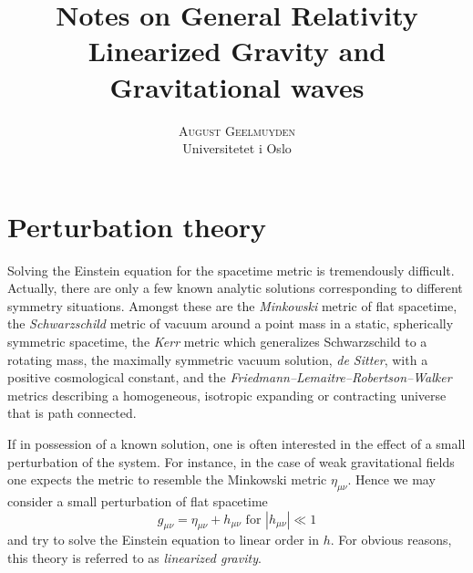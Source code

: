 \documentclass[twoside,utf8]{article}
\title{\vspace{-15mm}\fontsize{24pt}{10pt}\selectfont  Notes on General Relativity\\
\textbf{Linearized Gravity and Gravitational waves} } %
\author{
\large
\textsc{August Geelmuyden}\\[2mm] %
\normalsize Universitetet i Oslo \\ %
\vspace{-5mm}
}
\date{}
\begin{document}
\maketitle %











\section{Perturbation theory}

Solving the Einstein equation for the spacetime metric is tremendously difficult. Actually, there are only a few known analytic solutions corresponding to different symmetry situations. Amongst these are the {\it Minkowski} metric of flat spacetime, the {\it Schwarzschild} metric of vacuum around a point mass in a static, spherically symmetric spacetime, the {\it Kerr} metric which generalizes Schwarzschild to a rotating mass, the maximally symmetric vacuum solution, {\it de Sitter}, with a positive cosmological constant, and the {\it Friedmann–Lemaitre–Robertson–Walker} metrics describing a homogeneous, isotropic expanding or contracting universe that is path connected.

If in possession of a known solution, one is often interested in the effect of a small perturbation of the system. For instance, in the case of weak gravitational fields one expects the metric to resemble the Minkowski metric $\eta_{\mu\nu}$. Hence we may consider a small perturbation of flat spacetime
\[
g_{\mu\nu} = \eta_{\mu\nu} + h_{\mu\nu} \text{ for } |h_{\mu\nu}|\ll 1
\]
and try to solve the Einstein equation to linear order in $h$. For obvious reasons, this theory is referred to as {\it linearized gravity}.
\end{document}
